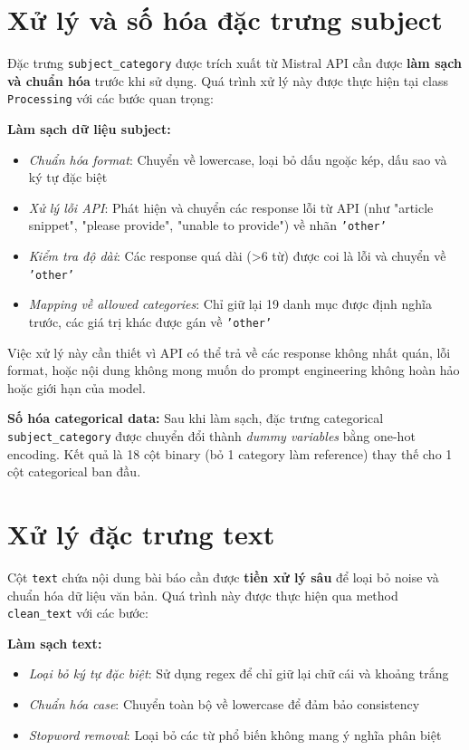 \section{Xử lý và số hóa đặc trưng subject}

Đặc trưng \texttt{subject\_category} được trích xuất từ Mistral API cần được \textbf{làm sạch và chuẩn hóa} trước khi sử dụng. Quá trình xử lý này được thực hiện tại class \texttt{Processing} với các bước quan trọng:

\noindent\textbf{Làm sạch dữ liệu subject:}
\begin{itemize}
    \item \textit{Chuẩn hóa format}: Chuyển về lowercase, loại bỏ dấu ngoặc kép, dấu sao và ký tự đặc biệt
    \item \textit{Xử lý lỗi API}: Phát hiện và chuyển các response lỗi từ API (như "article snippet", "please provide", "unable to provide") về nhãn \texttt{'other'}
    \item \textit{Kiểm tra độ dài}: Các response quá dài (>6 từ) được coi là lỗi và chuyển về \texttt{'other'}
    \item \textit{Mapping về allowed categories}: Chỉ giữ lại 19 danh mục được định nghĩa trước, các giá trị khác được gán về \texttt{'other'}
\end{itemize}

\noindent Việc xử lý này cần thiết vì API có thể trả về các response không nhất quán, lỗi format, hoặc nội dung không mong muốn do prompt engineering không hoàn hảo hoặc giới hạn của model.

\noindent\textbf{Số hóa categorical data:}
Sau khi làm sạch, đặc trưng categorical \texttt{subject\_category} được chuyển đổi thành \textit{dummy variables} bằng one-hot encoding. Kết quả là 18 cột binary (bỏ 1 category làm reference) thay thế cho 1 cột categorical ban đầu.

\section{Xử lý đặc trưng text}

Cột \texttt{text} chứa nội dung bài báo cần được \textbf{tiền xử lý sâu} để loại bỏ noise và chuẩn hóa dữ liệu văn bản. Quá trình này được thực hiện qua method \texttt{clean\_text} với các bước:

\noindent\textbf{Làm sạch text:}
\begin{itemize}
    \item \textit{Loại bỏ ký tự đặc biệt}: Sử dụng regex để chỉ giữ lại chữ cái và khoảng trắng
    \item \textit{Chuẩn hóa case}: Chuyển toàn bộ về lowercase để đảm bảo consistency
    \item \textit{Stopword removal}: Loại bỏ các từ phổ biến không mang ý nghĩa phân biệt
\end{itemize}

